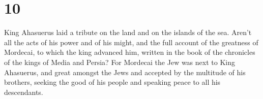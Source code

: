 \hypertarget{section-9}{%
\section{10}\label{section-9}}

 King Ahasuerus laid a tribute on the land and on the
islands of the sea.  Aren't all the acts of his power and of
his might, and the full account of the greatness of Mordecai, to which
the king advanced him, written in the book of the chronicles of the
kings of Media and Persia?  For Mordecai the Jew was next to
King Ahasuerus, and great amongst the Jews and accepted by the multitude
of his brothers, seeking the good of his people and speaking peace to
all his descendants.
